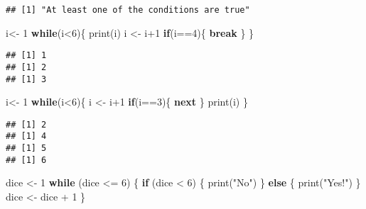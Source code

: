 \documentclass[
]{article}
\newenvironment{Shaded}{\begin{snugshade}}{\end{snugshade}}
\newcommand{\ControlFlowTok}[1]{\textcolor[rgb]{0.13,0.29,0.53}{\textbf{#1}}}
\newcommand{\DecValTok}[1]{\textcolor[rgb]{0.00,0.00,0.81}{#1}}
\newcommand{\FunctionTok}[1]{\textcolor[rgb]{0.00,0.00,0.00}{#1}}
\newcommand{\NormalTok}[1]{#1}
\newcommand{\OtherTok}[1]{\textcolor[rgb]{0.56,0.35,0.01}{#1}}
\newcommand{\SpecialCharTok}[1]{\textcolor[rgb]{0.00,0.00,0.00}{#1}}
\newcommand{\StringTok}[1]{\textcolor[rgb]{0.31,0.60,0.02}{#1}}
\begin{document}
\begin{verbatim}
## [1] "At least one of the conditions are true"
\end{verbatim}

\begin{Shaded}
\begin{Highlighting}[]
\NormalTok{i}\OtherTok{\textless{}{-}} \DecValTok{1}
\ControlFlowTok{while}\NormalTok{(i}\SpecialCharTok{\textless{}}\DecValTok{6}\NormalTok{)\{}
  \FunctionTok{print}\NormalTok{(i)}
\NormalTok{  i }\OtherTok{\textless{}{-}}\NormalTok{ i}\SpecialCharTok{+}\DecValTok{1}
  \ControlFlowTok{if}\NormalTok{(i}\SpecialCharTok{==}\DecValTok{4}\NormalTok{)\{}
    \ControlFlowTok{break}
\NormalTok{  \}}
\NormalTok{\}}
\end{Highlighting}
\end{Shaded}

\begin{verbatim}
## [1] 1
## [1] 2
## [1] 3
\end{verbatim}

\begin{Shaded}
\begin{Highlighting}[]
\NormalTok{i}\OtherTok{\textless{}{-}} \DecValTok{1}
\ControlFlowTok{while}\NormalTok{(i}\SpecialCharTok{\textless{}}\DecValTok{6}\NormalTok{)\{}
\NormalTok{  i }\OtherTok{\textless{}{-}}\NormalTok{ i}\SpecialCharTok{+}\DecValTok{1}
  \ControlFlowTok{if}\NormalTok{(i}\SpecialCharTok{==}\DecValTok{3}\NormalTok{)\{}
    \ControlFlowTok{next}
\NormalTok{  \}}
  \FunctionTok{print}\NormalTok{(i)}
\NormalTok{\}}
\end{Highlighting}
\end{Shaded}

\begin{verbatim}
## [1] 2
## [1] 4
## [1] 5
## [1] 6
\end{verbatim}

\begin{Shaded}
\begin{Highlighting}[]
\NormalTok{dice }\OtherTok{\textless{}{-}} \DecValTok{1} 
\ControlFlowTok{while}\NormalTok{ (dice }\SpecialCharTok{\textless{}=} \DecValTok{6}\NormalTok{) }
\NormalTok{  \{ }\ControlFlowTok{if}\NormalTok{ (dice }\SpecialCharTok{\textless{}} \DecValTok{6}\NormalTok{) \{}
    \FunctionTok{print}\NormalTok{(}\StringTok{"No"}\NormalTok{) }
\NormalTok{  \} }\ControlFlowTok{else}\NormalTok{ \{}
    \FunctionTok{print}\NormalTok{(}\StringTok{"Yes!"}\NormalTok{)}
\NormalTok{  \}}
\NormalTok{dice }\OtherTok{\textless{}{-}}\NormalTok{ dice }\SpecialCharTok{+} \DecValTok{1}
\NormalTok{\}}
\end{Highlighting}
\end{Shaded}
\end{document}
